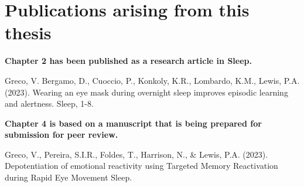 \markboth{}{}
\chapter*{Publications arising from this thesis}
\label{chapter:Publications arising from this thesis}
\textbf{Chapter 2 has been published as a research article in Sleep.} 

Greco, V. Bergamo, D., Cuoccio, P., Konkoly, K.R., Lombardo, K.M., Lewis, P.A. (2023). Wearing an eye mask during overnight sleep improves episodic learning and alertness. Sleep, 1-8. 

\vspace{1cm}

\textbf{Chapter 4 is based on a manuscript that is being prepared for submission for peer review. }

Greco, V., Pereira, S.I.R., Foldes, T., Harrison, N., \& Lewis, P.A. (2023). Depotentiation of emotional reactivity using Targeted Memory Reactivation during Rapid Eye Movement Sleep. 
